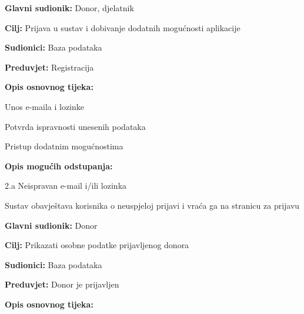 \documentclass[11pt]{book}
\begin{document}
\noindent {}
					\begin{packed_item}
	
						\item \textbf{Glavni sudionik: }Donor, djelatnik
						\item \textbf{Cilj:} Prijava u sustav i dobivanje dodatnih mogućnosti aplikacije
						\item \textbf{Sudionici:} Baza podataka
						\item \textbf{Preduvjet:} Registracija
						\item \textbf{Opis osnovnog tijeka:}
						
						\item[] \begin{packed_enum}
	
							\item Unos e-maila i lozinke
							\item Potvrda ispravnosti unesenih podataka
							\item Pristup dodatnim mogućnostima
							
						\end{packed_enum}
						\item  \textbf{Opis mogućih odstupanja:}
						
						\item[] \begin{packed_item}
	
							\item[2.a] Neispravan e-mail i/ili lozinka
							\item[] \begin{packed_enum}
								
								\item  Sustav obavještava korisnika o neuspjeloj prijavi i vraća ga na stranicu za prijavu

								
							\end{packed_enum}
					\end{packed_item}

\noindent {}
					\begin{packed_item}
	
						\item \textbf{Glavni sudionik: }Donor
						\item \textbf{Cilj:} Prikazati osobne podatke prijavljenog donora
						\item \textbf{Sudionici:} Baza podataka
						\item \textbf{Preduvjet:} Donor je prijavljen
						\item \textbf{Opis osnovnog tijeka:}
						

\end{packed_item}
\end{packed_item}
\end{document}
